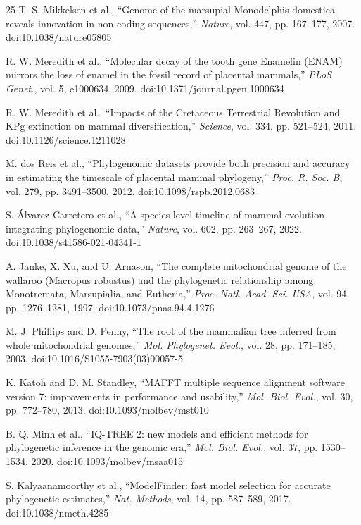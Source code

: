 \documentclass[10pt,letterpaper]{article}
\begin{document}
\begin{thebibliography}{25}
T. S. Mikkelsen et al., ``Genome of the marsupial Monodelphis domestica reveals innovation in non-coding sequences,'' \emph{Nature}, vol. 447, pp. 167--177, 2007. doi:10.1038/nature05805

R. W. Meredith et al., ``Molecular decay of the tooth gene Enamelin (ENAM) mirrors the loss of enamel in the fossil record of placental mammals,'' \emph{PLoS Genet.}, vol. 5, e1000634, 2009. doi:10.1371/journal.pgen.1000634

R. W. Meredith et al., ``Impacts of the Cretaceous Terrestrial Revolution and KPg extinction on mammal diversification,'' \emph{Science}, vol. 334, pp. 521--524, 2011. doi:10.1126/science.1211028

M. dos Reis et al., ``Phylogenomic datasets provide both precision and accuracy in estimating the timescale of placental mammal phylogeny,'' \emph{Proc. R. Soc. B}, vol. 279, pp. 3491--3500, 2012. doi:10.1098/rspb.2012.0683

S. \'Alvarez-Carretero et al., ``A species-level timeline of mammal evolution integrating phylogenomic data,'' \emph{Nature}, vol. 602, pp. 263--267, 2022. doi:10.1038/s41586-021-04341-1

A. Janke, X. Xu, and U. Arnason, ``The complete mitochondrial genome of the wallaroo (Macropus robustus) and the phylogenetic relationship among Monotremata, Marsupialia, and Eutheria,'' \emph{Proc. Natl. Acad. Sci. USA}, vol. 94, pp. 1276--1281, 1997. doi:10.1073/pnas.94.4.1276

M. J. Phillips and D. Penny, ``The root of the mammalian tree inferred from whole mitochondrial genomes,'' \emph{Mol. Phylogenet. Evol.}, vol. 28, pp. 171--185, 2003. doi:10.1016/S1055-7903(03)00057-5

K. Katoh and D. M. Standley, ``MAFFT multiple sequence alignment software version 7: improvements in performance and usability,'' \emph{Mol. Biol. Evol.}, vol. 30, pp. 772--780, 2013. doi:10.1093/molbev/mst010

B. Q. Minh et al., ``IQ-TREE 2: new models and efficient methods for phylogenetic inference in the genomic era,'' \emph{Mol. Biol. Evol.}, vol. 37, pp. 1530--1534, 2020. doi:10.1093/molbev/msaa015

S. Kalyaanamoorthy et al., ``ModelFinder: fast model selection for accurate phylogenetic estimates,'' \emph{Nat. Methods}, vol. 14, pp. 587--589, 2017. doi:10.1038/nmeth.4285


\end{thebibliography}
\end{document}
